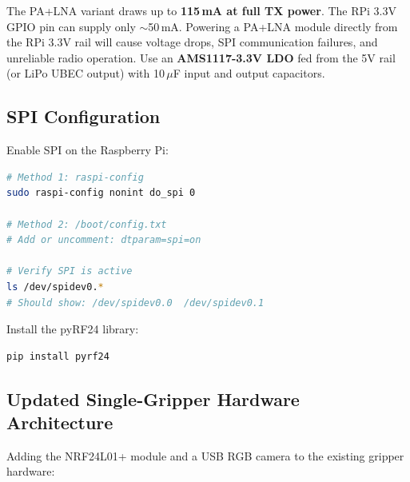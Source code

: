\documentclass[11pt,a4paper]{article}
\begin{document}
\begin{warningbox}
The PA+LNA variant draws up to \textbf{115\,mA at full TX power}. The RPi 3.3V GPIO pin can supply only ${\sim}$50\,mA. Powering a PA+LNA module directly from the RPi 3.3V rail will cause voltage drops, SPI communication failures, and unreliable radio operation. Use an \textbf{AMS1117-3.3V LDO} fed from the 5V rail (or LiPo UBEC output) with 10\,$\mu$F input and output capacitors.
\end{warningbox}

\subsection{SPI Configuration}

Enable SPI on the Raspberry Pi:

\begin{lstlisting}[language=bash, morekeywords={sudo,ls,pip}]
# Method 1: raspi-config
sudo raspi-config nonint do_spi 0

# Method 2: /boot/config.txt
# Add or uncomment: dtparam=spi=on

# Verify SPI is active
ls /dev/spidev0.*
# Should show: /dev/spidev0.0  /dev/spidev0.1
\end{lstlisting}

Install the pyRF24 library:

\begin{lstlisting}[language=bash, morekeywords={pip}]
pip install pyrf24
\end{lstlisting}

\subsection{Updated Single-Gripper Hardware Architecture}

Adding the NRF24L01+ module and a USB RGB camera to the existing gripper hardware:
\end{document}
